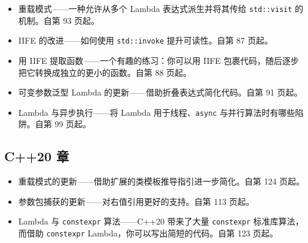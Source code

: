 \begin{itemize}
\item 重载模式——一种允许从多个 Lambda 表达式派生并将其传给 \texttt{std::visit} 的机制。自第 93 页起。
\item IIFE 的改进——如何使用 \texttt{std::invoke} 提升可读性。自第 87 页起。
\item 用 IIFE 提取函数——一个有趣的练习：你可以用 IIFE 包裹代码，随后逐步把它转换成独立的更小的函数。自第 88 页起。
\item 可变参数泛型 Lambda 的更新——借助折叠表达式简化代码。自第 91 页起。
\item Lambda 与异步执行——将 Lambda 用于线程、\texttt{async} 与并行算法时有哪些陷阱。自第 99 页起。
\end{itemize}

\subsection{C++20 章}

\begin{itemize}
\item 重载模式的更新——借助扩展的类模板推导指引进一步简化。自第 124 页起。
\item 参数包捕获的更新——对右值引用更好的支持。自第 113 页起。
\item Lambda 与 \texttt{constexpr} 算法——C++20 带来了大量 \texttt{constexpr} 标准库算法，而借助 \texttt{constexpr} Lambda，你可以写出简短的代码。自第 123 页起。
\end{itemize}
